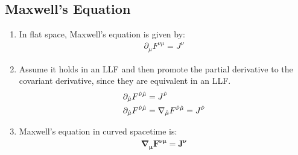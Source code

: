\documentclass[10pt]{article}
\begin{document}
            \subsection{Maxwell's Equation}
                \begin{enumerate}
                    \item In flat space, Maxwell's equation is given by:
                        \begin{align}
                            \partial_{\mu}F^{\nu\mu} = J^{\nu}
                        \end{align}
                    \item Assume it holds in an LLF and then promote the partial derivative to the covariant derivative, since they are equivalent in an LLF.
                        \begin{align}
                            \partial_{\hat{\mu}}F^{\hat{\nu}\hat{\mu}} &= J^{\hat{\nu}} \notag \\ 
                            \partial_{\hat{\mu}}F^{\hat{\nu}\hat{\mu}} &= \nabla_{\hat{\mu}}F^{\hat{\nu}\hat{\mu}} = J^{\hat{\nu}}
                        \end{align}
                    \item Maxwell's equation in curved spacetime is:
                        \begin{align}
                            \boldsymbol{\nabla_{\mu}F^{\nu\mu} = J^{\nu}}
                        \end{align}
                \end{enumerate}
            
\end{document}

